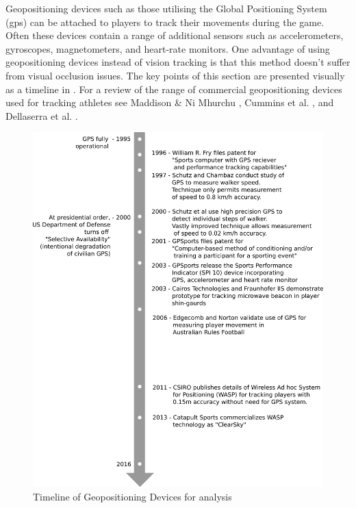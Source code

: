 Geopositioning devices such as those utilising the Global Positioning
System (\gls{gps}) can be attached to players to track their movements during
the game. Often these devices contain a range of additional sensors such
as accelerometers, gyroscopes, magnetometers, and heart-rate monitors. One advantage of using geopositioning devices instead of
vision tracking is that this method doesn't suffer from visual occlusion
issues. The key points of this section are presented visually as a
timeline in . For a review of the range of
commercial geopositioning devices used for tracking athletes see Maddison \& Ni Mhurchu \cite{Maddison2009}, Cummins et al. \cite{Cummins2013}, and Dellaserra et al. \cite{dellaserra_use_2014}.

\begin{figure}[htpb]
\centering
\includegraphics[width=\linewidth]{figs/model/timeline.png}
\caption{Timeline of Geopositioning Devices for \afl{} analysis\label{fig:timeline}}
\end{figure}

